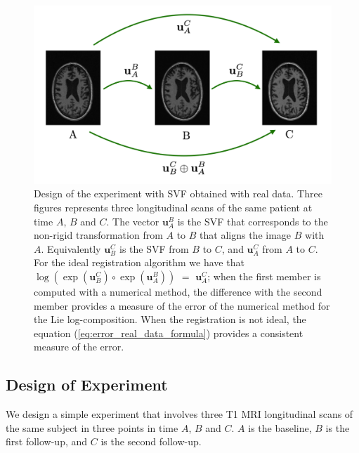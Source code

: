 \begin{figure}[!ht]
	\centering
	\includegraphics[scale=0.25]{figures/three_brains_problem.pdf}
	\caption{Design of the experiment with SVF obtained with real data. Three figures represents three  longitudinal scans of the same patient at time $A$, $B$ and $C$. The vector $\mathbf{u}_{A}^{B}$ is the SVF that corresponds to the non-rigid transformation from $A$ to $B$ that aligns the image $B$ with $A$. Equivalently $\mathbf{u}_{B}^{C}$ is the SVF from $B$ to $C$, and $\mathbf{u}_{A}^{C}$ from $A$ to $C$. For the ideal registration algorithm we have that $\log(\exp(\mathbf{u}_{B}^{C}) \circ \exp(\mathbf{u}_{A}^{B}))$ $=$ $\mathbf{u}_{A}^{C} $; when the first member is computed with a numerical method, the difference with the second member provides a measure of the error of the numerical method for the Lie log-composition. When the registration is not ideal, the equation (\ref{eq:error_real_data_formula}) provides a consistent measure of the error. }
	\label{fig:three_brains_problem}
\end{figure}

\subsection{Design of Experiment}
We design a simple experiment that involves three T1 MRI longitudinal scans of the same subject in three points in time $A$, $B$ and $C$. $A$ is the baseline, $B$ is the first follow-up, and $C$ is the second follow-up.


